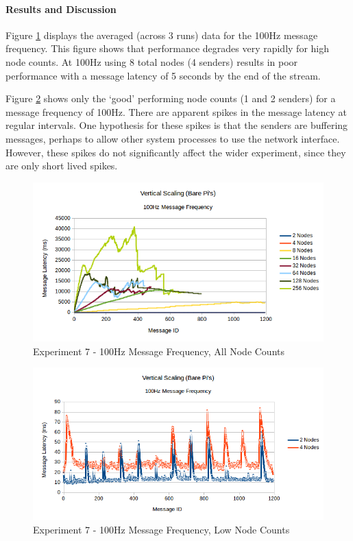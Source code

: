 \documentclass[../dissertation.tex]{subfiles}
\begin{document}
\paragraph{Results and Discussion} Figure \ref{exp7-100hz-allnodes} displays the averaged (across 3 runs) data for the 100Hz message frequency. This figure shows that performance degrades very rapidly for high node counts. At 100Hz using 8 total nodes (4 senders) results in poor performance with a message latency of 5 seconds by the end of the stream.

Figure \ref{exp7-100hz-lownodes} shows only the `good' performing node counts (1 and 2 senders) for a message frequency of 100Hz. There are apparent spikes in the message latency at regular intervals. One hypothesis for these spikes is that the senders are buffering messages, perhaps to allow other system processes to use the network interface. However, these spikes do not significantly affect the wider experiment, since they are only short lived spikes.

\begin{figure}[H]
\centering
\includegraphics[width=\textwidth]{images/experiment7/vertical_scaling_100hz_all_node_counts.png}
\caption{Experiment 7 - 100Hz Message Frequency, All Node Counts}
\label{exp7-100hz-allnodes}
\end{figure}

\begin{figure}[H]
\centering
\includegraphics[width=\textwidth]{images/experiment7/vertical_scaling_100hz_low_node_counts.png}
\caption{Experiment 7 - 100Hz Message Frequency, Low Node Counts}
\label{exp7-100hz-lownodes}
\end{figure}
\end{document}
